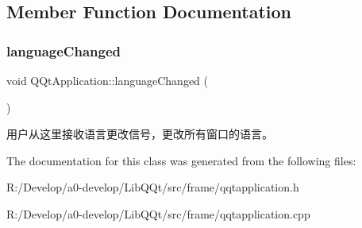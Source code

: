 \subsection{Member Function Documentation}
\mbox{\label{class_q_qt_application_a3411cfda9ee0ce5f155bd3b40a25eb6f}} 
\subsubsection{\texorpdfstring{language\+Changed}{languageChanged}}
{\footnotesize\ttfamily void Q\+Qt\+Application\+::language\+Changed (\begin{DoxyParamCaption}{ }\end{DoxyParamCaption})\hspace{0.3cm}{\ttfamily [signal]}}

用户从这里接收语言更改信号，更改所有窗口的语言。 

The documentation for this class was generated from the following files\+:\begin{DoxyCompactItemize}
\item 
R\+:/\+Develop/a0-\/develop/\+Lib\+Q\+Qt/src/frame/qqtapplication.\+h\item 
R\+:/\+Develop/a0-\/develop/\+Lib\+Q\+Qt/src/frame/qqtapplication.\+cpp\end{DoxyCompactItemize}
